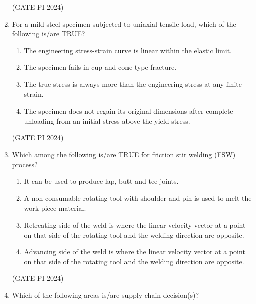 \documentclass[journal,12pt,onecolumn]{IEEEtran}
\theoremstyle{remark}
\begin{document}
\begin{enumerate}
\hfill (GATE PI 2024)

\item For a mild steel specimen subjected to uniaxial tensile load, which of the following is/are TRUE?
\begin{enumerate}
    \item The engineering stress-strain curve is linear within the elastic limit.
    \item The specimen fails in cup and cone type fracture.
    \item The true stress is always more than the engineering stress at any finite strain.
    \item The specimen does not regain its original dimensions after complete unloading from an initial stress above the yield stress.
\end{enumerate}

\hfill (GATE PI 2024)

\item Which among the following is/are TRUE for friction stir welding (FSW) process?


\begin{enumerate}
    \item It can be used to produce lap, butt and tee joints.
    \item A non-consumable rotating tool with shoulder and pin is used to melt the work-piece material.
    \item Retreating side of the weld is where the linear velocity vector at a point on that side of the rotating tool and the welding direction are opposite.
    \item Advancing side of the weld is where the linear velocity vector at a point on that side of the rotating tool and the welding direction are opposite.
\end{enumerate}

\hfill (GATE PI 2024)

\item Which of the following areas is/are supply chain decision(s)?

\begin{enumerate}
\end{enumerate}


\end{enumerate}
\end{document}
